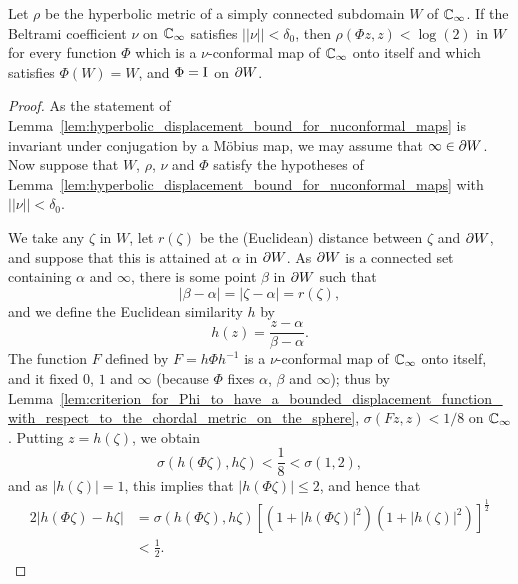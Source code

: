 \begin{lemma}
    \label{lem:hyperbolic_displacement_bound_for_nuconformal_maps}
    Let $\rho$ be the hyperbolic metric of a simply connected subdomain $W$ of
    $\mathbb{C}_\infty$. If the Beltrami coefficient $\nu$ on $\mathbb{C}_\infty$ satisfies $||\nu|| <
    \delta_0$, then $\rho(\Phi z, z) < \log(2)$ in $W$ for every function $\Phi$
    which is a $\nu$-conformal map of $\mathbb{C}_\infty$ onto itself and which satisfies
    $\Phi(W) = W$, and $\Phi = \mathrm{I}$ on $\partial {W}$.
\end{lemma}
\begin{proof}
    As the statement of
    Lemma~\ref{lem:hyperbolic_displacement_bound_for_nuconformal_maps} is
    invariant under conjugation by a Möbius map, we may assume that $\infty \in
    \partial {W}$. Now suppose that $W$, $\rho$, $\nu$ and $\Phi$ satisfy the
    hypotheses of
    Lemma~\ref{lem:hyperbolic_displacement_bound_for_nuconformal_maps} with
    $||\nu|| < \delta_0$.

    We take any $\zeta$ in $W$, let $r(\zeta)$ be the (Euclidean) distance
    between $\zeta$ and $\partial {W}$, and suppose that this is attained at
    $\alpha$ in $\partial {W}$. As $\partial {W}$ is a connected set containing
    $\alpha$ and $\infty$, there is some point $\beta$ in $\partial {W}$ such
    that
    \begin{equation*}
        |\beta - \alpha| = |\zeta - \alpha| = r(\zeta),
    \end{equation*}
    and we define the Euclidean similarity $h$ by
    \begin{equation*}
        h(z) = \frac{z - \alpha}{\beta - \alpha}.
    \end{equation*}
    The function $F$ defined by $F = h \Phi h^{-1}$ is a $\nu$-conformal map of
    $\mathbb{C}_\infty$ onto itself, and it fixed $0$, $1$ and $\infty$ (because $\Phi$
    fixes $\alpha$, $\beta$ and $\infty$); thus by
    Lemma~\ref{lem:criterion_for_Phi_to_have_a_bounded_displacement_function_with_respect_to_the_chordal_metric_on_the_sphere},
    $\sigma(F z, z) < 1/8$ on $\mathbb{C}_\infty$. Putting $z = h(\zeta)$, we obtain
    \begin{equation*}
        \sigma(h(\Phi \zeta), h \zeta) < \frac{1}{8} < \sigma(1, 2),
    \end{equation*}
    and as $|h(\zeta)| = 1$, this implies that $|h(\Phi \zeta)| \leq 2$, and
    hence that
    \begin{align*}
        2 |h(\Phi \zeta) - h \zeta| &= \sigma(h(\Phi \zeta), h \zeta)[(1 + |h(\Phi \zeta)|^2)(1 + |h(\zeta)|^2)]^{\frac{1}{2}} \\
                                    &< \frac{1}{2}.
    \end{align*}


\end{proof}
